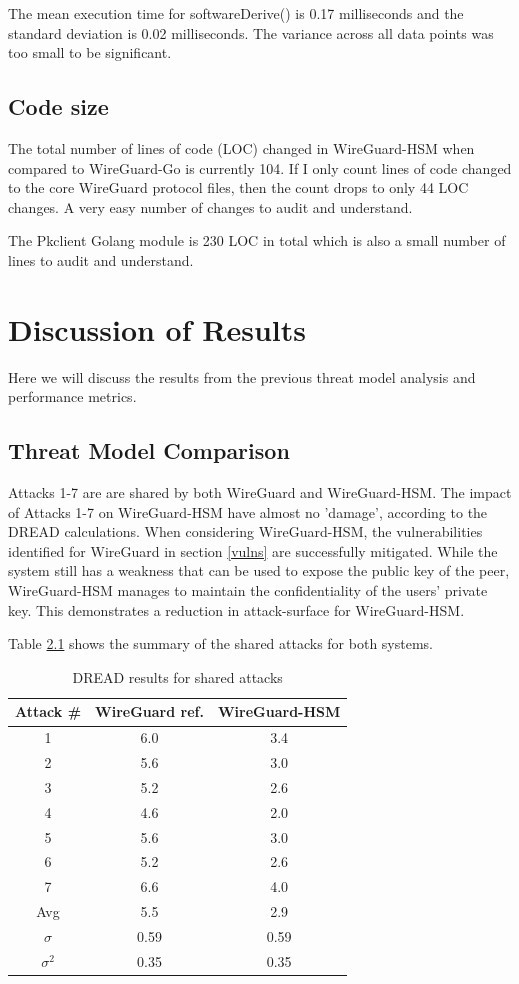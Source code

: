 \documentclass [11pt, proquest] {uwthesis}[2020/02/24]
\begin{document}
The mean execution time for softwareDerive() is 0.17 milliseconds and the standard deviation is 0.02 milliseconds. The variance across all data points was too small to be significant.

\section{Code size}
\label{loc}
The total number of lines of code (LOC) changed in WireGuard-HSM when compared to WireGuard-Go is currently 104. If I only count lines of code changed to the core WireGuard protocol files, then the count drops to only 44 LOC changes. A very easy number of changes to audit and understand.

The Pkclient Golang module is 230 LOC in total which is also a small number of lines to audit and understand.

\chapter {Discussion of Results}
Here we will discuss the results from the previous threat model analysis and performance metrics.

\section{Threat Model Comparison}
Attacks 1-7 are are shared by both WireGuard and WireGuard-HSM. The impact of Attacks 1-7 on WireGuard-HSM have almost no 'damage', according to the DREAD calculations. When considering WireGuard-HSM, the vulnerabilities identified for WireGuard in section \ref{vulns} are successfully mitigated. While the system still has a weakness that can be used to expose the public key of the peer, WireGuard-HSM manages to maintain the confidentiality of the users' private key. This demonstrates a reduction in attack-surface for WireGuard-HSM.

Table \ref{tab:DREAD_AVG} shows the summary of the shared attacks for both systems.

\begin{table}[H]
  \begin{center}
    \label{tab:DREAD_AVG}
    \begin{tabular}{c|c|c}
      \textbf{Attack \#} & \textbf{WireGuard ref.} & \textbf{WireGuard-HSM}\\
      \hline
      1 & 6.0 & 3.4\\
      2 & 5.6 & 3.0\\
      3 & 5.2 & 2.6\\
      4 & 4.6 & 2.0\\
      5 & 5.6 & 3.0\\
      6 & 5.2 & 2.6\\
      7 & 6.6 & 4.0\\
    \hline
    Avg & 5.5 & 2.9\\
    $\sigma$ &  0.59 & 0.59\\
    $\sigma^2$ &  0.35 & 0.35\\
    \end{tabular}
\caption{DREAD results for shared attacks}
  \end{center}
\end{table}
\end{document}
